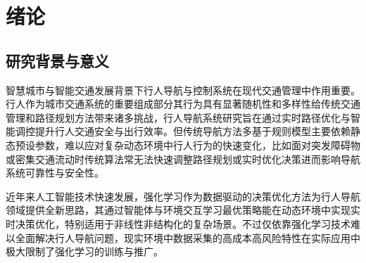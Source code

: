 \chapter{绪论}

\section{研究背景与意义}

智慧城市与智能交通发展背景下行人导航与控制系统在现代交通管理中作用重要。行人作为城市交通系统的重要组成部分其行为具有显著随机性和多样性给传统交通管理和路径规划方法带来诸多挑战，行人导航系统研究旨在通过实时路径优化与智能调控提升行人交通安全与出行效率。但传统导航方法多基于规则模型主要依赖静态预设参数，难以应对复杂动态环境中行人行为的快速变化，比如面对突发障碍物或密集交通流动时传统算法常无法快速调整路径规划或实时优化决策进而影响导航系统可靠性与安全性。

近年来人工智能技术快速发展，强化学习作为数据驱动的决策优化方法为行人导航领域提供全新思路，其通过智能体与环境交互学习最优策略能在动态环境中实现实时决策优化，特别适用于非线性非结构化的复杂场景。不过仅依靠强化学习技术难以全面解决行人导航问题，现实环境中数据采集的高成本高风险特性在实际应用中极大限制了强化学习的训练与推广。

